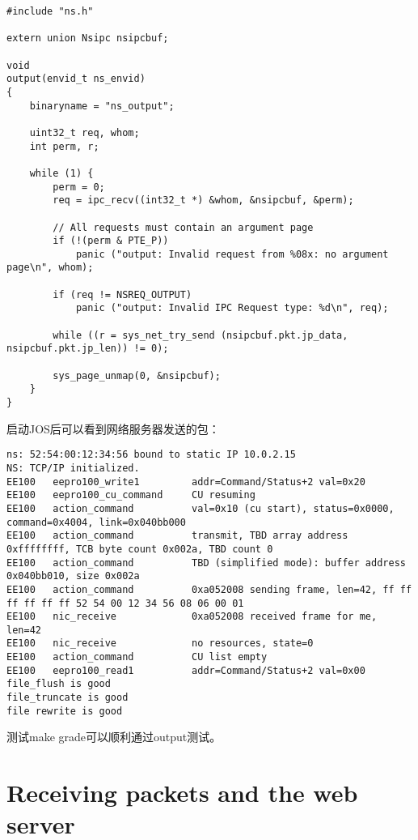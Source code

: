 \documentclass{article}
\begin{document}
\begin{CJK*}{UTF8}{gkai}
\begin{lstlisting}[style=ccode, title={\scriptsize \ttfamily \bfseries net/output.c}]
#include "ns.h"

extern union Nsipc nsipcbuf;

void
output(envid_t ns_envid)
{
    binaryname = "ns_output";

    uint32_t req, whom;
    int perm, r;

    while (1) {
        perm = 0;
        req = ipc_recv((int32_t *) &whom, &nsipcbuf, &perm);
    
        // All requests must contain an argument page
        if (!(perm & PTE_P))
            panic ("output: Invalid request from %08x: no argument page\n", whom);

        if (req != NSREQ_OUTPUT)
            panic ("output: Invalid IPC Request type: %d\n", req);

        while ((r = sys_net_try_send (nsipcbuf.pkt.jp_data, nsipcbuf.pkt.jp_len)) != 0);

        sys_page_unmap(0, &nsipcbuf);
    }
}
\end{lstlisting}

启动JOS后可以看到网络服务器发送的包：

\vspace{1em}

\begin{lstlisting}[style=console, basicstyle=\tiny\color{green}\ttfamily\bfseries]
ns: 52:54:00:12:34:56 bound to static IP 10.0.2.15
NS: TCP/IP initialized.
EE100	eepro100_write1         addr=Command/Status+2 val=0x20
EE100	eepro100_cu_command     CU resuming
EE100	action_command          val=0x10 (cu start), status=0x0000, command=0x4004, link=0x040bb000
EE100	action_command          transmit, TBD array address 0xffffffff, TCB byte count 0x002a, TBD count 0
EE100	action_command          TBD (simplified mode): buffer address 0x040bb010, size 0x002a
EE100	action_command          0xa052008 sending frame, len=42, ff ff ff ff ff ff 52 54 00 12 34 56 08 06 00 01
EE100	nic_receive             0xa052008 received frame for me, len=42
EE100	nic_receive             no resources, state=0
EE100	action_command          CU list empty
EE100	eepro100_read1          addr=Command/Status+2 val=0x00
file_flush is good
file_truncate is good
file rewrite is good
\end{lstlisting}

测试make grade可以顺利通过output测试。


\section{Receiving packets and the web server}


\end{CJK*}
\end{document}
